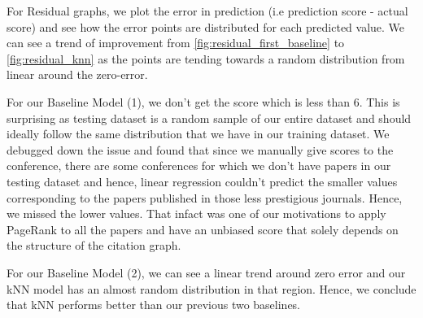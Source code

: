 \documentclass[a4paper, 11pt]{article}
\begin{document}
For Residual graphs, we plot the error in prediction (i.e prediction score - actual score) and see how the error points are distributed for each predicted value. We can see a trend of improvement from \ref{fig:residual_first_baseline} to \ref{fig:residual_knn} as the points are tending towards a random distribution from linear around the zero-error.

\vspace{0.5cm}

For our Baseline Model (1), we don't get the score which is less than 6. This is surprising as testing dataset is a random sample of our entire dataset and should ideally follow the same distribution that we have in our training dataset. We debugged down the issue and found that since we manually give scores to the conference, there are some conferences for which we don't have papers in our testing dataset and hence, linear regression couldn't predict the smaller values corresponding to the papers published in those less prestigious journals. Hence, we missed the lower values. That infact was one of our motivations to apply PageRank to all the papers and have an unbiased score that solely depends on the structure of the citation graph.

\vspace{0.5cm}

For our Baseline Model (2), we can see a linear trend around zero error and our kNN model has an almost random distribution in that region. Hence, we conclude that kNN performs better than our previous two baselines. 
 
\end{document}
